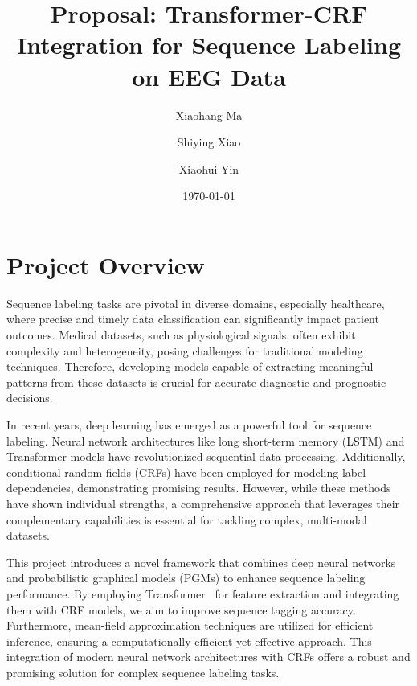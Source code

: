 \documentclass[12pt]{article}
\begin{document}
\title{Proposal: Transformer-CRF Integration for Sequence Labeling on EEG Data}

\author[1]{Xiaohang Ma}
\author[2]{Shiying Xiao}
\author[2]{Xiaohui Yin}


\date{\today}

\maketitle


\section{Project Overview}


Sequence labeling tasks are pivotal in diverse domains, especially healthcare,
where precise and timely data classification can significantly impact patient
outcomes. Medical datasets, such as physiological signals, often exhibit
complexity and heterogeneity, posing challenges for traditional modeling
techniques. Therefore, developing models capable of extracting meaningful
patterns from these datasets is crucial for accurate diagnostic and prognostic
decisions.


In recent years, deep learning has emerged as a powerful tool for sequence
labeling. Neural network architectures like long short-term memory (LSTM) and
Transformer models have revolutionized sequential data processing.
Additionally, conditional random fields (CRFs) have been employed for modeling
label dependencies, demonstrating promising results.
However, while these methods have shown individual strengths, a comprehensive
approach that leverages their complementary capabilities is essential for
tackling complex, multi-modal datasets.


This project introduces a novel framework that combines deep neural networks
and probabilistic graphical models (PGMs) to enhance sequence labeling
performance. By employing Transformer~\citep{vaswani2017attention} for feature
extraction and integrating them with CRF models,
we aim to improve sequence tagging accuracy. Furthermore, mean-field
approximation techniques are utilized for efficient inference, ensuring a
computationally efficient yet effective approach.
This integration of modern neural network architectures with CRFs offers
a robust and promising solution for complex sequence labeling tasks.
\end{document}
